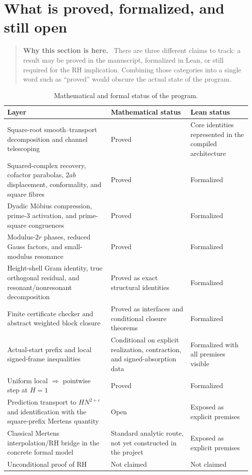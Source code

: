\documentclass[11pt]{article}
\theoremstyle{definition}
\theoremstyle{remark}
\newcommand{\eps}{\varepsilon}
\newcommand{\1}{\mathbf{1}}
\newenvironment{motivation}
  {\begin{quote}\small\color{ovvogray}\textbf{Why this section is here.}\ }
  {\end{quote}}
\begin{document}
\section{What is proved, formalized, and still open}
\label{sec:status}

\begin{motivation}
There are three different claims to track: a result may be proved in the manuscript, formalized in Lean, or still required for the RH implication.  Combining those categories into a single word such as ``proved'' would obscure the actual state of the program.
\end{motivation}

\begin{table}[htbp]
\centering
\caption{Mathematical and formal status of the program.}
\label{tab:status}
\small
\renewcommand{\arraystretch}{1.22}
\begin{tabular}{>{\raggedright\arraybackslash}p{}
                >{\raggedright\arraybackslash}p{}
                >{\raggedright\arraybackslash}p{}}
\toprule
Layer & Mathematical status & Lean status\\
\midrule
Square-root smooth--transport decomposition and channel telescoping
& Proved
& Core identities represented in the compiled architecture\\
Squared-complex recovery, cofactor parabolas, $2ab$ displacement, conformality, and square fibres
& Proved
& Formalized\\
Dyadic M\"obius compression, prime-$3$ activation, and prime-square congruences
& Proved
& Formalized\\
Modulus-$2r$ phases, reduced Gauss factors, and small-modulus resonance
& Proved
& Formalized\\
Height-shell Gram identity, true orthogonal residual, and resonant/nonresonant decomposition
& Proved as exact structural identities
& Formalized\\
Finite certificate checker and abstract weighted block closure
& Proved as interfaces and conditional closure theorems
& Formalized\\
Actual-start prefix and local signed-frame inequalities
& Conditional on explicit realization, contraction, and signed-absorption data
& Formalized with all premises visible\\
Uniform local $\Rightarrow$ pointwise step at $H=1$
& Proved
& Formalized\\
Prediction transport to $HN^{2+\eps}$ and identification with the square-prefix Mertens quantity
& Open
& Exposed as explicit premises\\
Classical Mertens interpolation/RH bridge in the concrete formal model
& Standard analytic route, not yet constructed in the project
& Exposed as explicit premises\\
Unconditional proof of RH
& Not claimed
& Not claimed\\
\bottomrule
\end{tabular}
\end{table}
\end{document}
